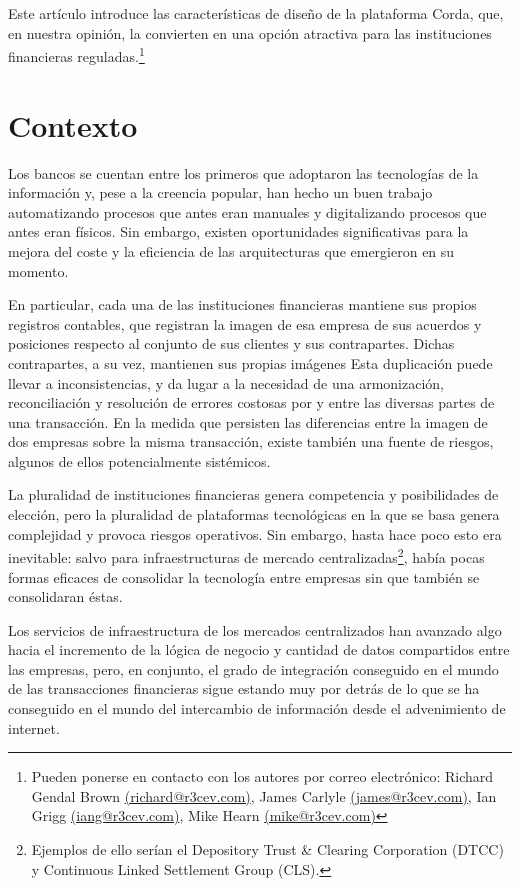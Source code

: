 \documentclass{article}
\begin{document}
Este artículo introduce las características de diseño de la plataforma Corda, que, en nuestra opinión, la convierten en una opción atractiva para las instituciones financieras reguladas.\footnote{Pueden ponerse en contacto con los autores por correo electrónico: Richard Gendal Brown \href{mailto:richard@r3cev.com}{(richard@r3cev.com)}, James Carlyle \href{mailto:james@r3cev.com}{(james@r3cev.com)}, Ian Grigg \href{mailto:iang@r3cev.com}{(iang@r3cev.com)}, Mike Hearn \href{mailto:mike@r3cev.com}{(mike@r3cev.com)}}

\section{Contexto}
Los bancos se cuentan entre los primeros que adoptaron las tecnologías de la información y, pese a la creencia popular, han hecho un buen trabajo automatizando procesos que antes eran manuales y digitalizando procesos que antes eran físicos. Sin embargo, existen oportunidades significativas para la mejora del coste y la eficiencia de las arquitecturas que emergieron en su momento. 

En particular, cada una de las instituciones financieras mantiene sus propios registros contables, que registran la imagen de esa empresa de sus acuerdos y posiciones respecto al conjunto de sus clientes y sus contrapartes. Dichas contrapartes, a su vez, mantienen sus propias imágenes Esta duplicación puede llevar a inconsistencias, y da lugar a la necesidad de una armonización, reconciliación y resolución de errores costosas por y entre las diversas partes de una transacción. En la medida que persisten las diferencias entre la imagen de dos empresas sobre la misma transacción, existe también una fuente de riesgos, algunos de ellos potencialmente sistémicos.

La pluralidad de instituciones financieras genera competencia y posibilidades de elección, pero la pluralidad de plataformas tecnológicas en la que se basa genera complejidad y provoca riesgos operativos. Sin embargo, hasta hace poco esto era inevitable: salvo para infraestructuras de mercado centralizadas\footnote{Ejemplos de ello serían el Depository Trust \& Clearing Corporation (DTCC) y Continuous Linked Settlement Group (CLS).}, había pocas formas eficaces de consolidar la tecnología entre empresas sin que también se consolidaran éstas.

Los servicios de infraestructura de los mercados centralizados han avanzado algo hacia el incremento de la lógica de negocio y cantidad de datos compartidos entre las empresas, pero, en conjunto, el grado de integración conseguido en el mundo de las transacciones financieras sigue estando muy por detrás de lo que se ha conseguido en el mundo del intercambio de información desde el advenimiento de internet. \cite{IT}
\end{document}
